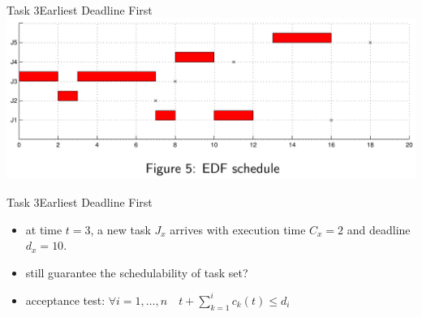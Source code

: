 \begin{frame}{Task 3}{Earliest Deadline First}
  \includegraphics[width=\textwidth]{./figures/3_sol.png}
\end{frame}

\begin{frame}{Task 3}{Earliest Deadline First}
  \begin{tasknoinc}
    \begin{itemize}
      \item at time $t = 3$, a new task $J_x$ arrives with execution time $C_x = 2$ and deadline $d_x = 10$.
      \item still \alert{guarantee the schedulability} of task set?
    \end{itemize}
  \end{tasknoinc}
  \begin{requirements}
    \begin{itemize}
      \item \alert{acceptance test:} $\displaystyle \forall i=1, \ldots, n \quad t+\sum_{k=1}^i c_k(t) \leq d_i$
    \end{itemize}
  \end{requirements}
\end{frame}

